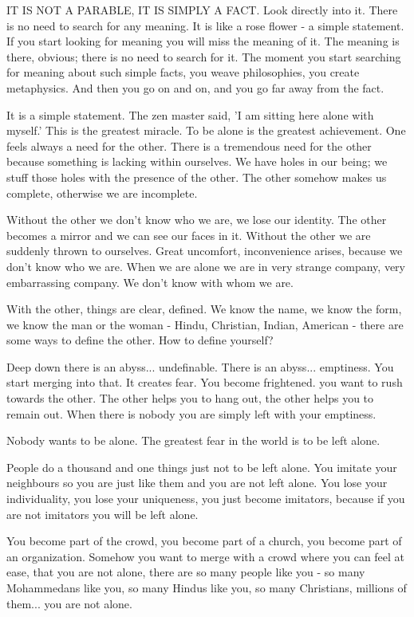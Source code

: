 IT IS NOT A PARABLE, IT IS SIMPLY A FACT. Look directly into it. There is no need to search for any meaning. It is like a rose flower - a simple statement. If you start looking for meaning you will miss the meaning of it. The meaning is there, obvious; there is no need to search for it. The moment you start searching for meaning about such simple facts, you weave philosophies, you create metaphysics. And then you go on and on, and you go far away from the fact.

It is a simple statement. The zen master said, 'I am sitting here alone with myself.' This is the greatest miracle. To be alone is the greatest achievement. One feels always a need for the other. There is a tremendous need for the other because something is lacking within ourselves. We have holes in our being; we stuff those holes with the presence of the other. The other somehow makes us complete, otherwise we are incomplete.

Without the other we don't know who we are, we lose our identity. The other becomes a mirror and we can see our faces in it. Without the other we are suddenly thrown to ourselves. Great uncomfort, inconvenience arises, because we don't know who we are. When we are alone we are in very strange company, very embarrassing company. We don't know with whom we are.

With the other, things are clear, defined. We know the name, we know the form, we know the man or the woman - Hindu, Christian, Indian, American - there are some ways to define the other. How to define yourself?

Deep down there is an abyss... undefinable. There is an abyss... emptiness. You start merging into that. It creates fear. You become frightened. you want to rush towards the other. The other helps you to hang out, the other helps you to remain out. When there is nobody you are simply left with your emptiness.

Nobody wants to be alone. The greatest fear in the world is to be left alone.

People do a thousand and one things just not to be left alone. You imitate your neighbours so you are just like them and you are not left alone. You lose your individuality, you lose your uniqueness, you just become imitators, because if you are not imitators you will be left alone.

You become part of the crowd, you become part of a church, you become part of an organization. Somehow you want to merge with a crowd where you can feel at ease, that you are not alone, there are so many people like you - so many Mohammedans like you, so many Hindus like you, so many Christians, millions of them... you are not alone.

